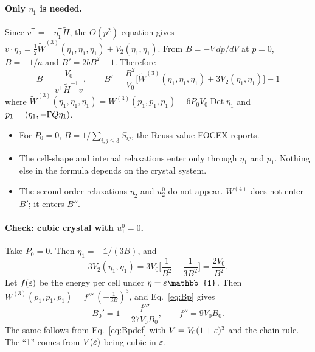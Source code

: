 \documentclass[11pt,a4paper]{article}
\newcommand{\Det}{\operatorname{Det}}
\newcommand{\Id}{\mathbb{1}}
\newcommand{\Wt}{W^{(3)}}\newcommand{\Wf}{W^{(4)}}
\begin{document}
\paragraph{Only $\eta_1$ is needed.} Since $v^{\mathsf T}=-\eta_1^{\mathsf T}\tilde H$, the $O(p^2)$ equation gives
$v\cdot\eta_2=\tfrac12\tilde W^{(3)}(\eta_1,\eta_1,\eta_1)+V_2(\eta_1,\eta_1)$. From $B=-V\,dp/dV$ at $p=0$,
$B=-1/a$ and $B'=2bB^2-1$. Therefore
\begin{equation}
\boxed{\;B=\frac{V_0}{v^{\mathsf T}\tilde H^{-1}v},\qquad
B'=\frac{B^2}{V_0}\Big[\tilde W^{(3)}(\eta_1,\eta_1,\eta_1)+3V_2(\eta_1,\eta_1)\Big]-1\;}
\label{eq:Bp}
\end{equation}
where $\tilde W^{(3)}(\eta_1,\eta_1,\eta_1)=\Wt(p_1,p_1,p_1)+6P_0V_0\Det\eta_1$ and $p_1=(\eta_1,-\Gamma Q\eta_1)$.
\begin{itemize}
\item For $P_0=0$, $B=1/\sum_{i,j\le3}S_{ij}$, the Reuss value FOCEX reports.
\item The cell-shape and internal relaxations enter only through $\eta_1$ and $p_1$. Nothing else in the
  formula depends on the crystal system.
\item The second-order relaxations $\eta_2$ and $u^0_2$ do not appear. $\Wf$ does not enter $B'$; it enters $B''$.
\end{itemize}

\paragraph{Check: cubic crystal with $u^0_1=0$.} Take $P_0=0$. Then $\eta_1=-\Id/(3B)$, and
\[
3V_2(\eta_1,\eta_1)=3V_0\Big[\frac1{B^2}-\frac1{3B^2}\Big]=\frac{2V_0}{B^2}.
\]
Let $f(\varepsilon)$ be the energy per cell under $\eta=\ep\Id$. Then $\Wt(p_1,p_1,p_1)=f'''\,(-\tfrac1{3B})^3$, and
Eq.~\eqref{eq:Bp} gives
\begin{equation}
B_0'=1-\frac{f'''}{27V_0B_0},\qquad f''=9V_0B_0 .
\label{eq:cubic}
\end{equation}
The same follows from Eq.~\eqref{eq:Bpdef} with $V=V_0(1+\varepsilon)^3$ and the chain rule. The ``1'' comes from
$V(\varepsilon)$ being cubic in $\varepsilon$.
\end{document}

